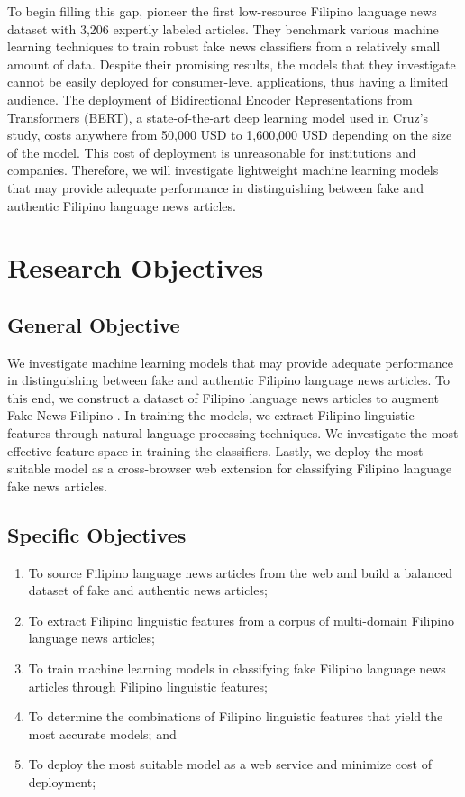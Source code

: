 To begin filling this gap,  pioneer the first low-resource Filipino language news dataset with 3,206 expertly labeled articles. They benchmark various machine learning techniques to train robust fake news classifiers from a relatively small amount of data. Despite their promising results, the models that they investigate cannot be easily deployed for consumer-level applications, thus having a limited audience. The deployment of Bidirectional Encoder Representations from Transformers (BERT), a state-of-the-art deep learning model used in Cruz's study, costs anywhere from 50,000 USD to 1,600,000 USD \cite{paleyes-2022} depending on the size of the model. This cost of deployment is unreasonable for institutions and companies. Therefore, we will investigate lightweight machine learning models that may provide adequate performance in distinguishing between fake and authentic Filipino language news articles.

\section{Research Objectives}
\label{sec:researchobjectives}

\subsection{General Objective}
\label{sec:generalobjective}

We investigate machine learning models that may provide adequate performance in distinguishing between fake and authentic Filipino language news articles. To this end, we construct a dataset of Filipino language news articles to augment Fake News Filipino \cite{fake-news-filipino}. In training the models, we extract Filipino linguistic features \cite{imperial-2020, imperial-2021} through natural language processing techniques. We investigate the most effective feature space in training the classifiers. Lastly, we deploy the most suitable model as a cross-browser web extension for classifying Filipino language fake news articles.

\subsection{Specific Objectives}
\label{sec:specificobjectives}

\begin{enumerate}
   \item To source Filipino language news articles from the web and build a balanced dataset of fake and authentic news articles;
   \item To extract Filipino linguistic features from a corpus of multi-domain Filipino language news articles;
   \item  To train machine learning models in classifying fake Filipino language news articles through Filipino linguistic features;
   \item To determine the combinations of Filipino linguistic features that yield the most accurate models; and
   \item To deploy the most suitable model as a web service and minimize cost of deployment;
\end{enumerate}

